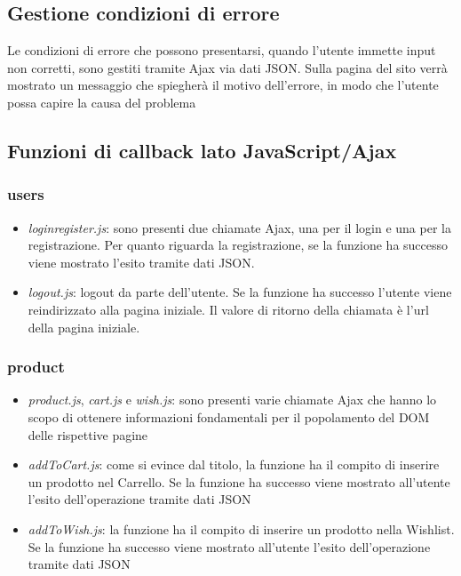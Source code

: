 \documentclass[12pt]{extarticle}
\begin{document}
\subsection{Gestione condizioni di errore}
Le condizioni di errore che possono presentarsi, quando l'utente immette input non corretti, sono
gestiti tramite Ajax via dati JSON. Sulla pagina del sito verrà mostrato un messaggio che
spiegherà il motivo dell'errore, in modo che l'utente possa capire la causa del problema

\subsection{Funzioni di callback lato JavaScript/Ajax}

\subsubsection*{users}
\begin{itemize}
    \item \textit{loginregister.js}: sono presenti due chiamate Ajax, una per il login e una per la registrazione.
    Per quanto riguarda la registrazione, se la funzione ha successo viene mostrato l'esito
    tramite dati JSON.
    \item \textit{logout.js}: logout da parte dell'utente. Se la funzione ha successo l'utente viene reindirizzato
    alla pagina iniziale. Il valore di ritorno della chiamata è l'url della pagina iniziale.
\end{itemize}

\subsubsection*{product}
\begin{itemize}
    \item \textit{product.js}, \textit{cart.js} e \textit{wish.js}: sono presenti varie chiamate Ajax che hanno lo scopo di
ottenere informazioni fondamentali per il popolamento del DOM delle rispettive pagine
    \item \textit{addToCart.js}: come si evince dal titolo, la funzione ha il compito di inserire un prodotto nel
Carrello. Se la funzione ha successo viene mostrato all'utente l'esito dell'operazione tramite
dati JSON
    \item \textit{addToWish.js}: la funzione ha il compito di inserire un prodotto nella Wishlist. Se la funzione
ha successo viene mostrato all'utente l'esito dell'operazione tramite dati JSON
\end{itemize}
\end{document}

